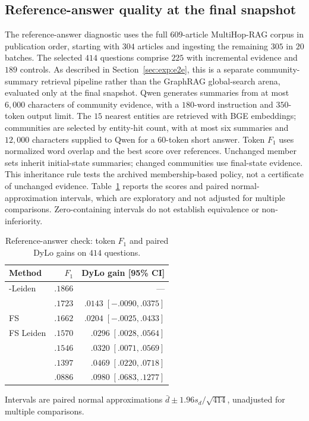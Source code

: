 \subsection{Reference-answer quality at the final snapshot}
\label{app:groundtruth}

The reference-answer diagnostic uses the full $609$-article MultiHop-RAG
corpus in publication order, starting with $304$ articles and ingesting the
remaining $305$ in $20$ batches. The selected $414$ questions comprise $225$
with incremental evidence and $189$ controls. As described in
Section~\ref{sec:exp:e2e}, this is a separate community-summary retrieval
pipeline rather than the GraphRAG global-search arena, evaluated only at the
final snapshot. Qwen generates summaries from at most $6{,}000$ characters
of community evidence, with a $180$-word instruction and $350$-token output
limit. The $15$ nearest entities are retrieved with BGE embeddings;
communities are selected by entity-hit count, with at most six summaries and
$12{,}000$ characters supplied to Qwen for a $60$-token short answer.
Token $F_1$ uses normalized word overlap and the best score over references. Unchanged member sets inherit initial-state summaries;
changed communities use final-state evidence. This inheritance rule tests
the archived membership-based policy, not a certificate of unchanged evidence.
Table~\ref{tab:groundtruth-scores} reports the scores and paired
normal-approximation intervals, which are exploratory and not adjusted for
multiple comparisons. Zero-containing intervals do not establish
equivalence or non-inferiority.

\begin{table}[tb]\centering
\caption{Reference-answer check: token $F_1$ and paired DyLo gains on $414$ questions.}
\label{tab:groundtruth-scores}
\begin{footnotesize}
\setlength{\tabcolsep}{0.25em}
\begin{tabular*}{\linewidth}{@{\extracolsep{\fill}}lrr@{}}
\toprule
Method & $F_1$ & DyLo gain [95\% CI] \\
\midrule
\DyLo{}-Leiden & $.1866$ & --- \\
\QCA{} & $.1723$ & $.0143\;[-.0090,.0375]$ \\
FS \Louvain{} & $.1662$ & $.0204\;[-.0025,.0433]$ \\
FS Leiden & $.1570$ & $.0296\;[.0028,.0564]$ \\
\Batch{} & $.1546$ & $.0320\;[.0071,.0569]$ \\
\DynaMo{} & $.1397$ & $.0469\;[.0220,.0718]$ \\
\GreMod{} & $.0886$ & $.0980\;[.0683,.1277]$ \\
\bottomrule
\end{tabular*}
\par\smallskip\raggedright
Intervals are paired normal approximations
$\bar d\pm1.96s_d/\sqrt{414}$, unadjusted for multiple comparisons.
\end{footnotesize}
\end{table}


